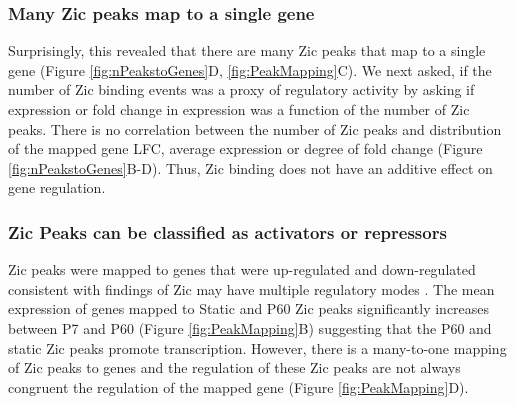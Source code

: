 \documentclass[fleqn,10pt,twocolumn]{wlscirep}
\begin{document}

\subsubsection*{Many Zic peaks map to a single gene}
Surprisingly, this revealed that there are many Zic peaks that map to a single gene (Figure \ref{fig:nPeakstoGenes}D, \ref{fig:PeakMapping}C). We next asked, if the number of Zic binding events was a proxy of regulatory activity by asking if expression or fold change in expression was a function of the number of Zic peaks. There is no correlation between the number of Zic peaks and distribution of the mapped gene LFC, average expression or degree of fold change (Figure \ref{fig:nPeakstoGenes}B-D). Thus, Zic binding does not have an additive effect on gene regulation. 



\subsubsection*{Zic Peaks can be classified as activators or repressors}
Zic peaks were mapped to genes that were up-regulated and down-regulated consistent with findings of Zic may have multiple regulatory modes \cite{Ishiguro2018LinkExpression, Himeda2013Pax3Enhancer}. The mean expression of genes mapped to Static and P60 Zic peaks significantly increases between P7 and P60 (Figure \ref{fig:PeakMapping}B) suggesting that the P60 and static Zic peaks promote transcription. However, there is a many-to-one mapping of Zic peaks to genes and the regulation of these Zic peaks are not always congruent the regulation of the mapped gene (Figure \ref{fig:PeakMapping}D). 
\end{document}
